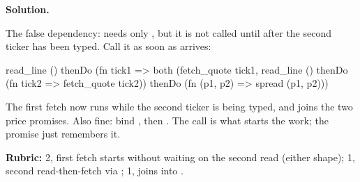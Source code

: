 \documentclass[crop=false]{standalone}
\newif\ifsol
\newenvironment{solution}
    {\par\color{solution_color}\begin{framed}\textbf{Solution.}\par}
    {\end{framed}}
\newcommand{\answerspace}[1]{\ifsol\else\vspace{#1}\par\fi}
\begin{document}
\answerspace{5.5cm}

\begin{solution}
The false dependency:  needs only ,
but it is not called until after the second ticker has been typed. Call
it as soon as  arrives:

\begin{codeblock}
  read_line () thenDo (fn tick1 =>
    both (fetch_quote tick1,
          read_line () thenDo (fn tick2 => fetch_quote tick2))
      thenDo (fn (p1, p2) => spread (p1, p2)))
\end{codeblock}
The first fetch now runs while the second ticker is being typed, and
 joins the two price promises. Also fine: bind , then . The call is what starts the work;
the promise just remembers it.

\textbf{Rubric:} 2, first fetch starts without waiting on the second
read (either shape); 1, second read-then-fetch via ; 1,
 joins into .
\end{solution}
\end{document}

